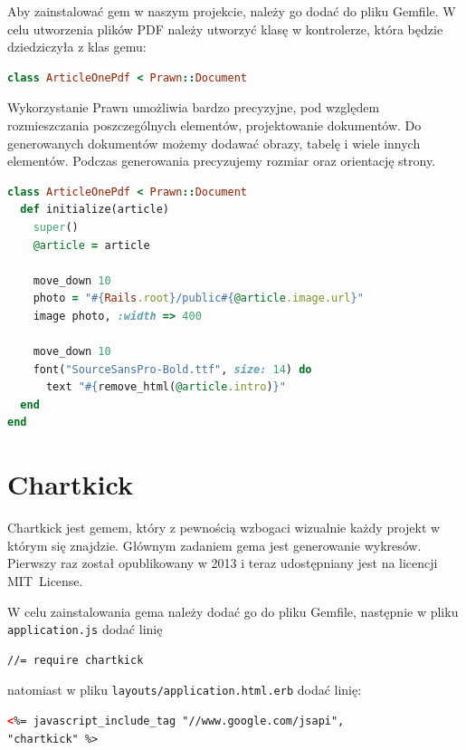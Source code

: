 \documentclass[openright]{xmgr}
\begin{document}
Aby zainstalować gem w naszym projekcie, należy go dodać do pliku Gemfile. W celu utworzenia plików PDF należy utworzyć klasę w kontrolerze, która będzie dziedziczyła z klas gemu:
\begin{lstlisting}[language=ruby, caption={Deklaracja klasy generującej plik PDF}]
class ArticleOnePdf < Prawn::Document
\end{lstlisting}
Wykorzystanie Prawn umożliwia bardzo precyzyjne, pod względem rozmieszczania poszczególnych elementów, projektowanie dokumentów. Do generowanych dokumentów możemy dodawać obrazy, tabelę  i wiele innych elementów. Podczas generowania precyzujemy rozmiar oraz orientację strony. 
\begin{lstlisting}[language=ruby, caption={Kod generujacy dokment zawierający ilustrację i wstęp do artykułu}]
class ArticleOnePdf < Prawn::Document
  def initialize(article)
    super()
    @article = article    

    move_down 10
    photo = "#{Rails.root}/public#{@article.image.url}"
    image photo, :width => 400

    move_down 10
    font("SourceSansPro-Bold.ttf", size: 14) do
      text "#{remove_html(@article.intro)}"
  end
end
\end{lstlisting}

\newpage

\section{Chartkick}
Chartkick \cite{chartkick} jest gemem, który z pewnością wzbogaci wizualnie każdy projekt w którym się znajdzie. Głównym zadaniem gema jest generowanie wykresów. Pierwszy raz został opublikowany w 2013 i teraz udostępniany jest na licencji \mbox{MIT License. }

W celu zainstalowania gema należy dodać go do pliku Gemfile, następnie w pliku \texttt{application.js} dodać linię 
\begin{lstlisting}[language=html, caption={Framgent zawartości pliku application.js}]
//= require chartkick
\end{lstlisting}
natomiast w pliku \texttt{layouts/application.html.erb} dodać linię:
\begin{lstlisting}[language=html, caption={Framgent zawartości pliku application.html.rb}]
<%= javascript_include_tag "//www.google.com/jsapi", 
"chartkick" %>
\end{lstlisting}

\newpage
\end{document}
